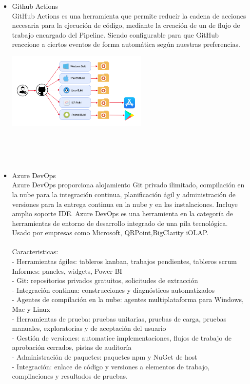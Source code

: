 \documentclass[twoside,twocolumn]{article}
\begin{document}
\begin{itemize}
\begin{center}
	\end{center}
 \item Github Actions\\
 GitHub Actions es una herramienta que permite reducir la cadena de acciones necesaria para la ejecución de código, mediante la creación de un de flujo de trabajo encargado del Pipeline. Siendo configurable para que GitHub reaccione a ciertos eventos de forma automática según nuestras preferencias.\\
 \begin{center}
	\includegraphics[width=7cm]{./imagenes/github.png} 
	\end{center}\\\\\\
 \item Azure DevOps\\
 Azure DevOps proporciona alojamiento Git privado ilimitado, compilación en la nube para la integración continua, planificación ágil y administración de versiones para la entrega continua en la nube y en las instalaciones. Incluye amplio soporte IDE.
Azure DevOps es una herramienta en la categoría de herramientas de entorno de desarrollo integrado de una pila tecnológica. Usado por empresas como Microsoft, QRPoint,BigClarity iOLAP.\\
\\Caracteristicas:\\
- Herramientas ágiles: tableros kanban, trabajos pendientes, tableros scrum
Informes: paneles, widgets, Power BI\\
- Git: repositorios privados gratuitos, solicitudes de extracción\\
- Integración continua: construcciones y diagnósticos automatizados\\
- Agentes de compilación en la nube: agentes multiplataforma para Windows, Mac y Linux\\
- Herramientas de prueba: pruebas unitarias, pruebas de carga, pruebas manuales, exploratorias y de aceptación del usuario\\
- Gestión de versiones: automatice implementaciones, flujos de trabajo de aprobación cerrados, pistas de auditoría\\
- Administración de paquetes: paquetes npm y NuGet de host\\
- Integración: enlace de código y versiones a elementos de trabajo, compilaciones y resultados de pruebas.


\end{itemize}
\end{document}
